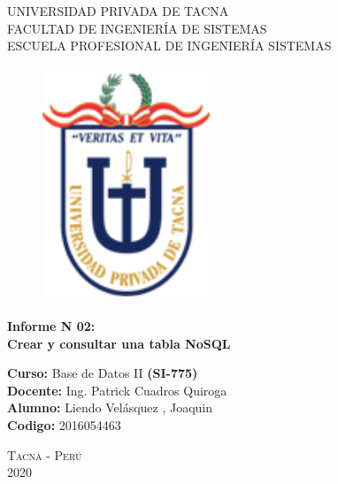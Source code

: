 \documentclass[12pt,a4paper,oneside]{book}
\begin{document}
	
	\thispagestyle{empty} 
	
	\begin{center} 
		\LARGE{UNIVERSIDAD PRIVADA DE TACNA} \\[0.5cm] \Large{FACULTAD DE INGENIERÍA DE SISTEMAS}\\[0.5cm] \large{ ESCUELA PROFESIONAL DE INGENIERÍA SISTEMAS} 
	\end{center}
	
	\begin{figure}[htb]
		\centering \includegraphics[width=5cm, height=7cm]{img/uptlogo.png}
	\end{figure}
	
	\begin{center} \LARGE{\bf Informe N 02:}\\ \vspace{.25cm} { 
			\Large \bfseries {Crear y consultar una tabla NoSQL }}\\ 
		
	\end{center}
	
	\large{\bf Curso: } Base de Datos II
	\textbf{(SI-775)}\\
	\large{\bf Docente: } Ing. Patrick Cuadros Quiroga\\
	\large{\bf Alumno: } Liendo Velásquez , Joaquin\\
	\large{\bf Codigo: } 2016054463\\
	
	
	
	\begin{center} 
		\Large \textsc{Tacna - Perú} \\
		\Large \textsc{2020 } 
	\end{center}

	\newpage
	
\end{document}
